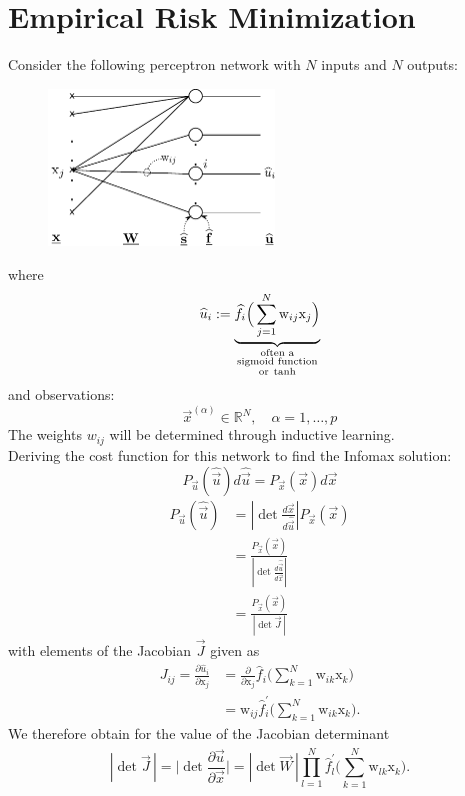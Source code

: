 \section{Empirical Risk Minimization}
Consider the following perceptron network with $N$ inputs and $N$ outputs:
\begin{figure}[ht]
\centering
\includegraphics[width=6cm]{img/section2_fig16}
\end{figure}
where
$$
\widehat{u}_i := \underbrace{
	\widehat{f}_i 
	\Big( \sum_{j=1}^{N} \mathrm{w}_{ij} 
		\mathrm{x}_j 
	\Big) }_{
	\substack{
		\text{often a} \\
		\text{sigmoid function}\\
		\text{or\;} \tanh}
	}
$$
and observations:
$$
\vec{x}^{(\alpha)} \in \mathbb{R}^N, 
		\quad \alpha = 1, \ldots, p
$$
The weights $w_{ij}$ will be determined through inductive learning.\\
Deriving the cost function for this network to find the Infomax solution:
\begin{equation}
\label{eq:conservationvec}
	P_{\vec{u}} (\widehat{\vec{u}}) d \widehat{\vec{u}}
		= P_{\vec{x}}(\vec{x}) d \vec{x}
\end{equation}
\begin{align}
\label{eq:uxj}
	P_{\vec{u}} (\widehat{\vec{u}}) 
	& = \left| \det \frac{d \vec{x}}{d \widehat{\vec{u}}} \right|
		P_{\vec{x}}(\vec{x}) \\
	& = \frac{P_{\vec{x}}(\vec{x})}{ \left| \det
		\frac{d \widehat{\vec{u}}}{d \vec{x}} \right|}\\
    & = \frac{P_{\vec{x}}(\vec{x})}{|\det \vec{J}\,|}
\end{align}
with elements of the Jacobian $\vec J$ given as
\begin{align}
\label{eq:jacobelement}
 J_{ij}=
 \frac{\partial \widehat{u}_i}{\partial \mathrm{x}_j}
	& = \frac{\partial}{\partial \mathrm{x}_j} 
		\widehat{f}_i \bigg( \sum\limits_{k = 1}^N \mathrm{w}_{ik} 
		\mathrm{x}_k \bigg) \\
	& = \mathrm{w}_{ij} \widehat{f}_i^{'} \bigg( \sum\limits_{k = 1}^N 
		\mathrm{w}_{ik} \mathrm{x}_k \bigg).
\end{align}
We therefore obtain for the value of the Jacobian determinant
\begin{equation} \label{eq:functionalDeterminant}
|\det \vec {J}\,| = 
	\Big| \det \frac{\partial \widehat{\vec{u}}}{\partial \vec{x}} \Big|
	= |\det \vec{W}\, | \prod\limits_{l = 1}^N  \widehat{f}_l^{'} \Bigg( 
		\sum\limits_{k = 1}^N \mathrm{w}_{lk} \mathrm{x}_k \Bigg).
\end{equation}


